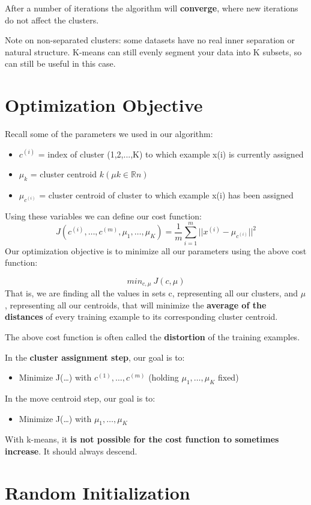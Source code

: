 After a number of iterations the algorithm will \textbf{converge}, where new iterations do not affect the clusters.

Note on non-separated clusters: some datasets have no real inner separation or natural structure. K-means can still evenly segment your data into K subsets, so can still be useful in this case.
\section{Optimization Objective}
Recall some of the parameters we used in our algorithm:
\begin{itemize}
	\item $c^{(i)}$ = index of cluster (1,2,...,K) to which example x(i) is currently assigned
	\item $\mu_k$ = cluster centroid $k(\mu k\in \mathbb{R}n)$
	\item $\mu_{c^{(i)}}$ = cluster centroid of cluster to which example x(i) has been assigned
\end{itemize}

Using these variables we can define our cost function:
\begin{equation}
J(c^{(i)},\dots,c^{(m)},\mu_1,\dots,\mu_K) = \dfrac{1}{m}\sum_{i=1}^m ||x^{(i)} - \mu_{c^{(i)}}||^2
\end{equation}
Our optimization objective is to minimize all our parameters using the above cost function:

$$min_{c,\mu}\ J(c,\mu)$$
That is, we are finding all the values in sets c, representing all our clusters, and $\mu$, representing all our centroids, that will minimize the \textbf{average of the distances} of every training example to its corresponding cluster centroid.

The above cost function is often called the \textbf{distortion} of the training examples.

In the \textbf{cluster assignment step}, our goal is to:
\begin{itemize}
	\item Minimize J(…) with $c^{(1)},\dots,c^{(m)}$ (holding $\mu_1,\dots,\mu_K$ fixed)
\end{itemize}

In the move centroid step, our goal is to:
\begin{itemize}
	\item Minimize J(…) with $\mu_1,\dots,\mu_K$
\end{itemize}

With k-means, it \textbf{is not possible for the cost function to sometimes increase}. It should always descend.

\section{Random Initialization}
